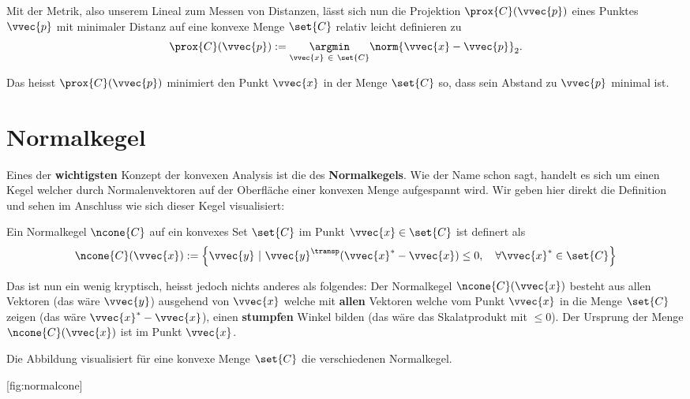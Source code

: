 \documentclass[
  12pt,
  british,
  a4paper,
  twoside,
  titlepage,
  openright,
  numbers=noenddot,
  chapterprefix=true,
  headings=optiontohead,
  svgnames,
  dvipsnames]{scrreprt}
\begin{document}
Mit der Metrik, also unserem Lineal zum Messen von Distanzen, lässt sich
nun die Projektion \(\prox{C}(\vvec{p})\) eines Punktes \(\vvec{p}\) mit
minimaler Distanz auf eine konvexe Menge \(\set{C}\) relativ leicht
definieren zu \begin{align}
\prox{C}(\vvec{p}) :=  \underset{\vvec{x} \ \in \ \set{C}}{\argmin} \norm{\vvec{x} - \vvec{p}}_2.
\end{align}

Das heisst \(\prox{C}(\vvec{p})\) minimiert den Punkt \(\vvec{x}\) in
der Menge \(\set{C}\) so, dass sein Abstand zu \(\vvec{p}\) minimal ist.

\hypertarget{normalkegel}{%
\section{Normalkegel}\label{normalkegel}}

Eines der \textbf{wichtigsten} Konzept der konvexen Analysis ist die des
\textbf{Normalkegels}. Wie der Name schon sagt, handelt es sich um einen
Kegel welcher durch Normalenvektoren auf der Oberfläche einer konvexen
Menge aufgespannt wird. Wir geben hier direkt die Definition und sehen
im Anschluss wie sich dieser Kegel visualisiert:

Ein Normalkegel \(\ncone{C}\) auf ein konvexes Set \(\set{C}\) im Punkt
\(\vvec{x} \in \set{C}\) ist definert als \begin{align}
    \ncone{C}(\vvec{x}) := \left\{ \vvec{y} \ | \ \vvec{y}^\transp(\vvec{x}^* - \vvec{x}) \leq 0, \quad \forall \vvec{x}^* \in \set{C} \right\}
\end{align}

Das ist nun ein wenig kryptisch, heisst jedoch nichts anderes als
folgendes: Der Normalkegel \(\ncone{C}(\vvec{x})\) besteht aus allen
Vektoren (das wäre \(\vvec{y}\)) ausgehend von \(\vvec{x}\) welche mit
\textbf{allen} Vektoren welche vom Punkt \(\vvec{x}\) in die Menge
\(\set{C}\) zeigen (das wäre \(\vvec{x}^* - \vvec{x}\)), einen
\textbf{stumpfen} Winkel bilden (das wäre das Skalatprodukt mit
\(\leq 0\)). Der Ursprung der Menge \(\ncone{C}(\vvec{x})\) ist im Punkt
\(\vvec{x}\).

Die Abbildung  visualisiert für eine konvexe
Menge \(\set{C}\) die verschiedenen Normalkegel.

[fig:normalcone]
\end{document}
